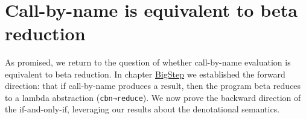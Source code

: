 \begin{fence}
\begin{code}
\>[2020I]\AgdaSymbol{|}\AgdaSpace{}%
\AgdaSpace{}%
\AgdaSpace{}%
\AgdaOperator{\AgdaInductiveConstructor{,}}\AgdaSpace{}%
\AgdaSpace{}%
\AgdaSpace{}%
\AgdaOperator{\AgdaInductiveConstructor{,}}\AgdaSpace{}%
\AgdaSpace{}%
\AgdaSpace{}%
\AgdaOperator{\AgdaInductiveConstructor{,}}\AgdaSpace{}%
\AgdaSpace{}%
\AgdaSpace{}%
\AgdaSpace{}%
\AgdaSpace{}%
\AgdaSymbol{=}\<%
\\
\>[.][@{}l@{}]\<[2020I]%
\>[4]\AgdaSpace{}%
\<%
\end{code}
\end{fence}

\hypertarget{call-by-name-is-equivalent-to-beta-reduction}{%
\section{Call-by-name is equivalent to beta
reduction}\label{call-by-name-is-equivalent-to-beta-reduction}}

As promised, we return to the question of whether call-by-name
evaluation is equivalent to beta reduction. In chapter
\protect\hyperlink{BigStep}{BigStep} we established the forward
direction: that if call-by-name produces a result, then the program beta
reduces to a lambda abstraction (\texttt{cbn→reduce}). We now prove the
backward direction of the if-and-only-if, leveraging our results about
the denotational semantics.

